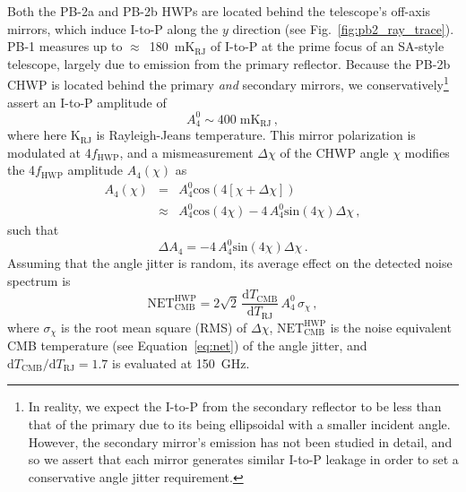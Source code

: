 Both the PB-2a and PB-2b HWPs are located behind the telescope's off-axis mirrors, which induce I-to-P along the $y$ direction (see Fig.~\ref{fig:pb2_ray_trace}). PB-1 measures up to $\approx$~180~$\mathrm{mK_{\mathrm{RJ}}}$ of I-to-P at the prime focus of an SA-style telescope, largely due to emission from the primary reflector.\cite{takakura_performance_2017} Because the PB-2b CHWP is located behind the primary \textit{and} secondary mirrors, we conservatively\footnote{In reality, we expect the I-to-P from the secondary reflector to be less than that of the primary due to its being ellipsoidal with a smaller incident angle. However, the secondary mirror's emission has not been studied in detail, and so we assert that each mirror generates similar I-to-P leakage in order to set a conservative angle jitter requirement.} assert an I-to-P amplitude of
\begin{equation}
    A_{4}^{0} \sim 400 \; \mathrm{mK_{\mathrm{RJ}}} \, ,
    \label{eq:4f_amp}
\end{equation}
where here $\mathrm{K_{RJ}}$ is Rayleigh-Jeans temperature. This mirror polarization is modulated at 4$f_{\mathrm{HWP}}$, and a mismeasurement $\Delta \chi$ of the CHWP angle $\chi$ modifies the 4$f_{\mathrm{HWP}}$ amplitude $A_{4}(\chi)$ as
\begin{eqnarray}
    A_{4}(\chi) & = & A_{4}^{0} \mathrm{cos}(4 \left[ \chi + \Delta \chi \right] ) \nonumber \\ & \approx & A_{4}^{0} \mathrm{cos}(4 \chi) - 4 \, A_{4}^{0} \mathrm{sin}(4 \chi) \Delta \chi \, ,
    \label{eq:freq_mod}
\end{eqnarray}
\noindent
such that
\begin{equation}
    \Delta A_{4} = -4 \, A_{4}^{0} \mathrm{sin}(4 \chi) \Delta \chi \, .
    \label{eq:delta_chi}
\end{equation}
Assuming that the angle jitter is random, its average effect on the detected noise spectrum is
\begin{equation}
    \mathrm{NET_{CMB}^{HWP}} = 2 \sqrt{2} \,  \frac{\mathrm{d} T_{\mathrm{CMB}}}{\mathrm{d} T_{\mathrm{RJ}}} \, A_{4}^{0} \, \sigma_{\chi} \, ,
    \label{eq:encoder_noise}
\end{equation}
\noindent
where $\sigma_{\chi}$ is the root mean square (RMS) of $\Delta \chi$, $\mathrm{NET_{CMB}^{HWP}}$ is the noise equivalent CMB temperature (see Equation~\ref{eq:net}) of the angle jitter, and $\mathrm{d} T_{\mathrm{CMB}} / \mathrm{d} T_{\mathrm{RJ}} = 1.7$ is evaluated at 150~GHz. 

